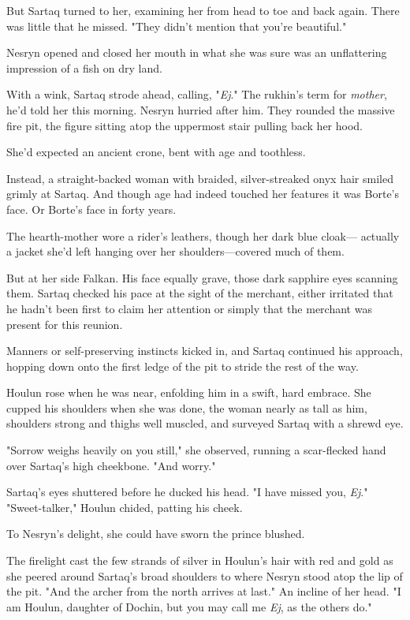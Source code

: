 But Sartaq turned to her, examining her from head to toe and back again. There was little that he missed. "They didn't mention that you're beautiful."

Nesryn opened and closed her mouth in what she was sure was an unflattering impression of a fish on dry land.

With a wink, Sartaq strode ahead, calling, "\emph{Ej}." The rukhin's term for \emph{mother}, he'd told her this morning. Nesryn hurried after him. They rounded the massive fire pit, the figure sitting atop the uppermost stair pulling back her hood.

She'd expected an ancient crone, bent with age and toothless.

Instead, a straight-backed woman with braided, silver-streaked onyx hair smiled grimly at Sartaq. And though age had indeed touched her features
 it was Borte's face. Or Borte's face in forty years.

The hearth-mother wore a rider's leathers, though her dark blue cloak--- actually a jacket she'd left hanging over her shoulders---covered much of them.

But at her side  Falkan. His face equally grave, those dark sapphire eyes scanning them. Sartaq checked his pace at the sight of the merchant, either irritated that he hadn't been first to claim her attention or simply that the merchant was present for this reunion.

Manners or self-preserving instincts kicked in, and Sartaq continued his approach, hopping down onto the first ledge of the pit to stride the rest of the way.

Houlun rose when he was near, enfolding him in a swift, hard embrace. She cupped his shoulders when she was done, the woman nearly as tall as him, shoulders strong and thighs well muscled, and surveyed Sartaq with a shrewd eye.

"Sorrow weighs heavily on you still," she observed, running a scar-flecked hand over Sartaq's high cheekbone. "And worry."

Sartaq's eyes shuttered before he ducked his head. "I have missed you,
\emph{Ej}." "Sweet-talker," Houlun chided, patting his cheek.

To Nesryn's delight, she could have sworn the prince blushed.

The firelight cast the few strands of silver in Houlun's hair with red and gold as she peered around Sartaq's broad shoulders to where Nesryn stood atop the lip of the pit. "And the archer from the north arrives at last." An incline of her head. "I am Houlun, daughter of Dochin, but you may call me \emph{Ej}, as the others do."

